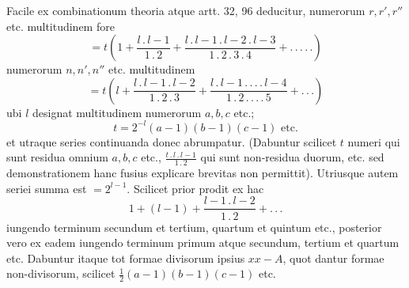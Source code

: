 Facile ex combinationum theoria atque artt. 32, 96 deducitur, numerorum $r,r',r''$ etc. multitudinem fore
\[
=t\left(1+\frac{l\, .\, l-1}{1\, .\, 2}+\frac{l\, .\, l-1\, .\, l-2\, .\, l-3}{1\, .\, 2\, .\, 3\, .\, 4}+ .\, .\, .\, .\, .\right)
\]
numerorum $n,n',n''$ etc. multitudinem
\[
=t\left(l+\frac{l\, .\, l-1\, .\, l-2}{1\, .\, 2\, .\, 3}+\frac{l\, .\, l-1\, .\, .\, .\, .\, l-4}{1\, .\, 2\, .\, .\, .\, .\, 5}+ .\, .\, .\right)
\]
ubi $l$ designat multitudinem numerorum $a,b,c$ etc.;
\[
t=2^{-l}(a-1)(b-1)(c-1)\text{ etc.}
\]
et utraque series continuanda donec abrumpatur. (Dabuntur scilicet $t$ numeri qui sunt residua omnium $a,b,c$ etc., $\frac{t\, .\, l\, .\, l-1}{1\, .\, 2}$ qui sunt non-residua duorum, etc. sed demonstrationem hanc fusius explicare brevitas non permittit). Utriusque autem seriei summa est $=2^{l-1}$. Scilicet prior prodit ex hac
\[
1+(l-1)+\frac{l-1\, .\, l-2}{1\, .\, 2}+ .\, .\, .
\]
iungendo terminum secundum et tertium, quartum et quintum etc., posterior vero ex eadem iungendo terminum primum atque secundum, tertium et quartum etc. Dabuntur itaque tot formae divisorum ipsius $xx-A$, quot dantur formae non-divisorum, scilicet $\frac{1}{2}(a-1)(b-1)(c-1)$ etc.


